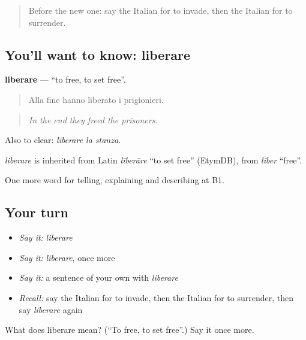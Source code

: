 \label{lesson:IT-C329-liberare}



\begin{quote}
Before the new one: say the Italian for to invade, then the Italian for to surrender.
\end{quote}

\subsection*{You'll want to know: liberare}
\textbf{liberare} — \textquotedblleft{}to free, to set free\textquotedblright{}.

\begin{quote}
Alla fine hanno liberato i prigionieri.
\end{quote}

\begin{quote}
\emph{In the end they freed the prisoners.}
\end{quote}

Also to clear: \emph{liberare la stanza}.

\begin{cousinweb}
\emph{liberare} is inherited from Latin \emph{līberāre} \textquotedblleft{}to set free\textquotedblright{} (EtymDB), from \emph{līber} \textquotedblleft{}free\textquotedblright{}.
\end{cousinweb}

\begin{grammarlens}[title={What you've built}]
One more word for telling, explaining and describing at B1.
\end{grammarlens}

\subsection*{Your turn}
\begin{itemize}
\raggedright
  \item \emph{Say it:} \emph{liberare}
  \item \emph{Say it:} \emph{liberare}, once more
  \item \emph{Say it:} a sentence of your own with \emph{liberare}
  \item \emph{Recall:} say the Italian for to invade, then the Italian for to surrender, then say \emph{liberare} again
\end{itemize}

\begin{tcolorbox}[breakable,colback=teal!4,colframe=teal!35!black,title={Before you move on}]
What does liberare mean? (\textquotedblleft{}To free, to set free\textquotedblright{}.) Say it once more.
\end{tcolorbox}
